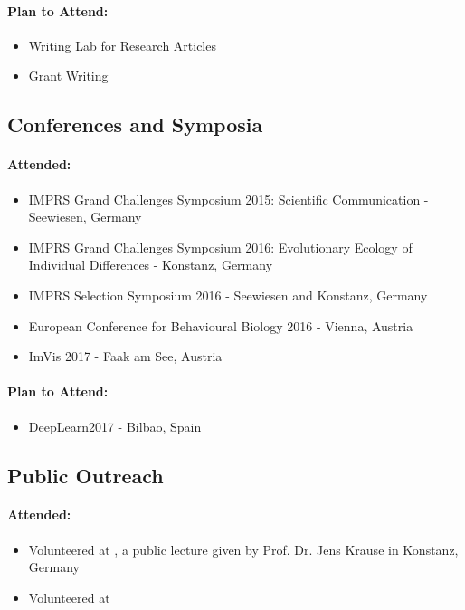\documentclass[11pt,a4paper,oneside]{article}
\begin{document}
\paragraph{Plan to Attend:}
\begin{itemize}
	\item Writing Lab for Research Articles
	\item Grant Writing
\end{itemize}
\subsection{Conferences and Symposia}
\paragraph{Attended:}
\begin{itemize}
	\item IMPRS Grand Challenges Symposium 2015: Scientific Communication - Seewiesen, Germany
	\item IMPRS Grand Challenges Symposium 2016: Evolutionary Ecology of Individual Differences - Konstanz, Germany
	\item IMPRS Selection Symposium 2016 - Seewiesen and Konstanz, Germany
	\item European Conference for Behavioural Biology 2016 - Vienna, Austria
	\item ImVis 2017 - Faak am See, Austria
\end{itemize}
\paragraph{Plan to Attend:}
\begin{itemize}
	\item DeepLearn2017 - Bilbao, Spain
\end{itemize}
\subsection{Public Outreach}
\paragraph{Attended:}
\begin{itemize}
	\item Volunteered at , a public lecture given by Prof. Dr. Jens Krause in Konstanz, Germany
	\item Volunteered at 
\end{itemize}
\end{document}
